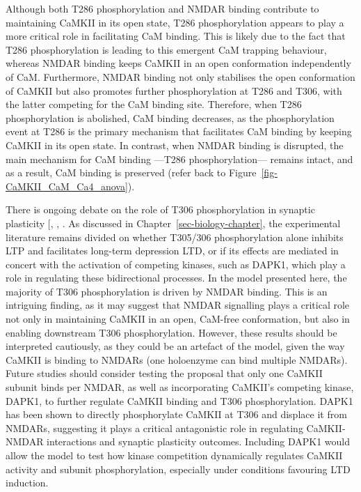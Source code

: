 \documentclass[
  11pt,
  letterpaper,
]{scrreprt}
\begin{document}
Although both T286 phosphorylation and NMDAR binding contribute to
maintaining CaMKII in its open state, T286 phosphorylation appears to
play a more critical role in facilitating CaM binding. This is likely
due to the fact that T286 phosphorylation is leading to this emergent
CaM trapping behaviour, whereas NMDAR binding keeps CaMKII in an open
conformation independently of CaM. Furthermore, NMDAR binding not only
stabilises the open conformation of CaMKII but also promotes further
phosphorylation at T286 and T306, with the latter competing for the CaM
binding site. Therefore, when T286 phosphorylation is abolished, CaM
binding decreases, as the phosphorylation event at T286 is the primary
mechanism that facilitates CaM binding by keeping CaMKII in its open
state. In contrast, when NMDAR binding is disrupted, the main mechanism
for CaM binding ---T286 phosphorylation--- remains intact, and as a
result, CaM binding is preserved (refer back to
Figure~\ref{fig-CaMKII_CaM_Ca4_anova}).

There is ongoing debate on the role of T306 phosphorylation in synaptic
plasticity {[},
,
\citeproc{ref-cook2021CaMKIIb}{198}{]}. As discussed in
Chapter~\ref{sec-biology-chapter}, the experimental literature remains
divided on whether T305/306 phosphorylation alone inhibits LTP and
facilitates long-term depression LTD, or if its effects are mediated in
concert with the activation of competing kinases, such as DAPK1, which
play a role in regulating these bidirectional processes. In the model
presented here, the majority of T306 phosphorylation is driven by NMDAR
binding. This is an intriguing finding, as it may suggest that NMDAR
signalling plays a critical role not only in maintaining CaMKII in an
open, CaM-free conformation, but also in enabling downstream T306
phosphorylation. However, these results should be interpreted
cautiously, as they could be an artefact of the model, given the way
CaMKII is binding to NMDARs (one holoenzyme can bind multiple NMDARs).
Future studies should consider testing the proposal that only one CaMKII
subunit binds per NMDAR, as well as incorporating CaMKII's competing
kinase, DAPK1, to further regulate CaMKII binding and T306
phosphorylation. DAPK1 has been shown to directly phosphorylate CaMKII
at T306 and displace it from NMDARs, suggesting it plays a critical
antagonistic role in regulating CaMKII-NMDAR interactions and synaptic
plasticity outcomes. Including DAPK1 would allow the model to test how
kinase competition dynamically regulates CaMKII activity and subunit
phosphorylation, especially under conditions favouring LTD induction.
\end{document}
